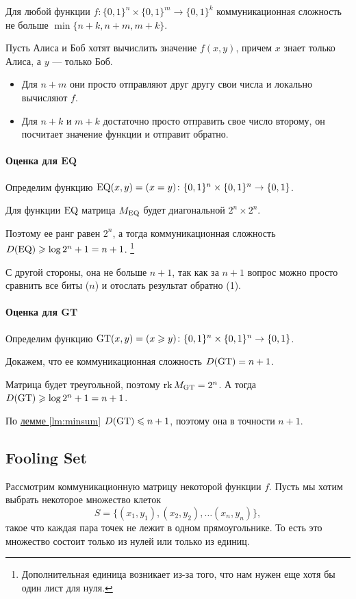 \begin{lm}\label{lm:minsum}
    Для любой функции $ f\colon \{0, 1\}^{n} \times  \{0, 1\}^{m} \to \{0, 1\}^{k}$ коммуникационная сложность не больше $ \min \{n+k, n+m, m+k\}$.
\end{lm}
\begin{proof*}
	Пусть Алиса и Боб хотят вычислить значение $ f(x, y)$, причем  $ x$ знает только Алиса, а $ y$ --- только Боб.
	\begin{itemize}
		\item Для $ n+m$ они просто отправляют друг другу свои числа и локально вычисляют $ f$.
		\item Для $ n+k$ и  $ m+k$ достаточно просто отправить свое число второму, он посчитает значение функции и отправит обратно.
	\end{itemize}

\end{proof*}

\paragraph{Оценка для $ \mathbf{EQ}$}
Определим функцию $ \operatorname{EQ}(x, y) = (x = y) \colon \{0, 1\}^{n} \times \{0, 1\}^{n} \to \{0, 1\}$.

Для функции $\operatorname{EQ}$ матрица $ M_{\operatorname{EQ}}$ будет диагональной $ 2^{n}\times 2^{n}$.

Поэтому ее ранг равен $ 2^{n}$, а тогда коммуникационная сложность
$ D(\operatorname{EQ}) \geqslant \log 2^{n} + 1= n +1$.
\footnote{Дополнительная единица возникает из-за того, что нам нужен еще хотя бы один лист для нуля.}

С другой стороны, она не больше $ n+1$, так как за  $ n+1$ вопрос можно просто сравнить все биты ($ n$) и отослать результат обратно (1).

\paragraph{Оценка для $\mathbf{GT}$}
Определим функцию $ \operatorname{GT}(x, y) = (x \geqslant y)\colon \{0, 1\}^{n} \times \{0, 1\}^{n} \to  \{0, 1\}$.

Докажем, что ее коммуникационная сложность $ D(\operatorname{GT}) = n+1$. 

Матрица будет треугольной, поэтому $ \operatorname{rk} M_{\operatorname{GT}} = 2^{n}$. 
А тогда $ D(\operatorname{GT}) \geqslant \log 2^{n} + 1= n+1$.

По \hyperref[lm:minsum]{лемме \ref{lm:minsum}} $ D(\operatorname{GT}) \leqslant n+1$, поэтому она в точности $ n+1$.


\subsection{Fooling Set}
Рассмотрим коммуникационную матрицу некоторой функции $ f$. Пусть мы хотим выбрать некоторое множество клеток 
\[
	S = \{(x_1, y_1), (x_2, y_2) , \ldots (x_{n}, y_{n})\}
,\] 
такое что каждая пара точек не лежит в одном прямоугольнике. То есть это множество состоит только из нулей или только из единиц.

